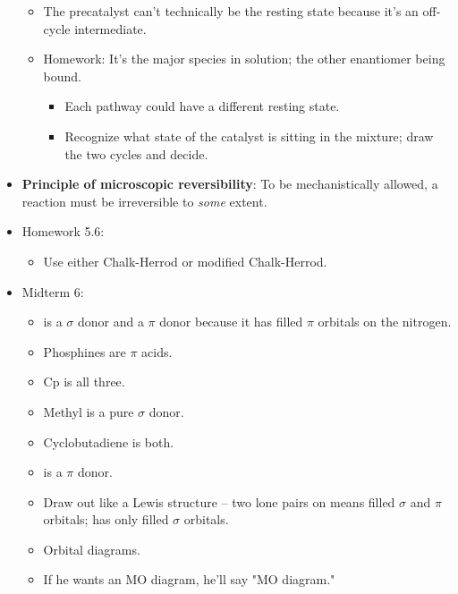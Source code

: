 \documentclass[../notes.tex]{subfiles}
\begin{document}
\begin{itemize}
    \begin{itemize}
        \item The precatalyst can't technically be the resting state because it's an off-cycle intermediate.
        \item Homework: It's the major species in solution; the other enantiomer being bound.
        \begin{itemize}
            \item Each pathway could have a different resting state.
            \item Recognize what state of the catalyst is sitting in the mixture; draw the two cycles and decide.
        \end{itemize}
    \end{itemize}
    \item \textbf{Principle of microscopic reversibility}: To be mechanistically allowed, a reaction must be irreversible to \emph{some} extent.
    \item Homework 5.6:
    \begin{itemize}
        \item Use either Chalk-Herrod or modified Chalk-Herrod.
    \end{itemize}
    \item Midterm 6:
    \begin{itemize}
        \item {} is a $\sigma$ donor and a $\pi$ donor because it has filled $\pi$ orbitals on the nitrogen.
        \item Phosphines are $\pi$ acids.
        \item Cp is all three.
        \item Methyl is a pure $\sigma$ donor.
        \item Cyclobutadiene is both.
        \item {} is a $\pi$ donor.
        \item Draw out like a Lewis structure -- two lone pairs on  means filled $\sigma$ and $\pi$ orbitals;  has only filled $\sigma$ orbitals.
        \item Orbital diagrams.
        \item If he wants an MO diagram, he'll say "MO diagram."
    \end{itemize}
\end{itemize}
\end{document}

